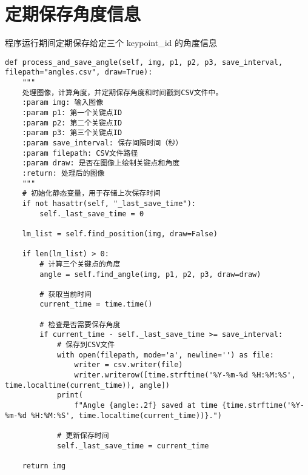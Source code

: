 \section{定期保存角度信息}

程序运行期间定期保存给定三个 keypoint\_id 的角度信息

\begin{lstlisting}
def process_and_save_angle(self, img, p1, p2, p3, save_interval, filepath="angles.csv", draw=True):
    """
    处理图像，计算角度，并定期保存角度和时间戳到CSV文件中。
    :param img: 输入图像
    :param p1: 第一个关键点ID
    :param p2: 第二个关键点ID
    :param p3: 第三个关键点ID
    :param save_interval: 保存间隔时间（秒）
    :param filepath: CSV文件路径
    :param draw: 是否在图像上绘制关键点和角度
    :return: 处理后的图像
    """
    # 初始化静态变量，用于存储上次保存时间
    if not hasattr(self, "_last_save_time"):
        self._last_save_time = 0

    lm_list = self.find_position(img, draw=False)

    if len(lm_list) > 0:
        # 计算三个关键点的角度
        angle = self.find_angle(img, p1, p2, p3, draw=draw)

        # 获取当前时间
        current_time = time.time()

        # 检查是否需要保存角度
        if current_time - self._last_save_time >= save_interval:
            # 保存到CSV文件
            with open(filepath, mode='a', newline='') as file:
                writer = csv.writer(file)
                writer.writerow([time.strftime('%Y-%m-%d %H:%M:%S', time.localtime(current_time)), angle])
            print(
                f"Angle {angle:.2f} saved at time {time.strftime('%Y-%m-%d %H:%M:%S', time.localtime(current_time))}.")

            # 更新保存时间
            self._last_save_time = current_time

    return img
\end{lstlisting}